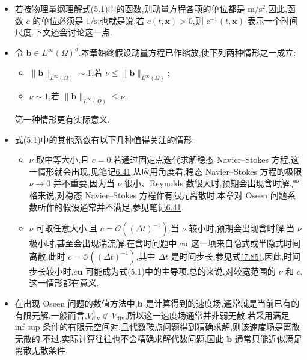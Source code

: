 \begin{note}[方程(5.1)中的系数]\label{note:oseen-coefficients}
\begin{itemize}
  \item 若按物理量纲理解式\hyperref[eq:oseen-strong]{(5.1)}中的函数,则动量方程各项的单位都是 $\mathrm{m}/\mathrm{s}^2$.因此,函数 $c$ 的单位必须是 $1/\mathrm{s}$;也就是说,若 $c(t,\bm{x})>0$,则 $c^{-1}(t,\bm{x})$ 表示一个时间尺度.下文还会讨论这一点.
  \item 令 $\bm{b}\in L^\infty(\Omega)^d$.本章始终假设动量方程已作缩放,使下列两种情形之一成立:
  \begin{itemize}
    \item $\|\bm{b}\|_{L^\infty(\Omega)}\sim1$,若 $\nu\le\|\bm{b}\|_{L^\infty(\Omega)}$;
    \item $\nu\sim1$,若 $\|\bm{b}\|_{L^\infty(\Omega)}\le\nu$.
  \end{itemize}
  第一种情形更有实际意义.
  \item 式\hyperref[eq:oseen-strong]{(5.1)}中的其他系数有以下几种值得关注的情形:
  \begin{itemize}
    \item $\nu$ 取中等大小,且 $c=0$.若通过固定点迭代求解稳态 Navier--Stokes 方程,这一情形就会出现,见笔记\hyperref[note:steady-ns-picard-iteration]{6.41}.从应用角度看,稳态 Navier--Stokes 方程的极限 $\nu\to0$ 并不重要,因为当 $\nu$ 很小、Reynolds 数很大时,预期会出现含时解.严格来说,对稳态 Navier--Stokes 方程作有限元离散时,本章对 Oseen 问题系数所作的假设通常并不满足,参见笔记\hyperref[note:steady-ns-picard-iteration]{6.41}.
    \item $\nu$ 可取任意大小,且 $c=\mathcal{O}((\Delta t)^{-1})$.当 $\nu$ 较小时,预期会出现含时解;当 $\nu$ 极小时,甚至会出现湍流解.在含时问题中,$c\bm{u}$ 这一项来自隐式或半隐式时间离散,此时 $c=\mathcal{O}((\Delta t)^{-1})$,其中 $\Delta t$ 是时间步长,参见式\hyperref[eq:general-theta-picard]{(7.85)}.因此,时间步长较小时,$c\bm{u}$ 可能成为式(5.1)中的主导项.总的来说,对较宽范围的 $\nu$ 和 $c$,这一情形都有意义.
  \end{itemize}
  \item 在出现 Oseen 问题的数值方法中,$\bm{b}$ 是计算得到的速度场,通常就是当前已有的有限元解.一般而言,$V_{\mathrm{div}}^h\not\subset V_{\mathrm{div}}$,所以这一速度场通常并非弱无散.若采用满足 inf-sup 条件的有限元空间对,且代数鞍点问题得到精确求解,则该速度场是离散无散的.不过,实际计算往往也不会精确求解代数问题,因此 $\bm{b}$ 通常只能近似满足离散无散条件.
\end{itemize}
\end{note}




